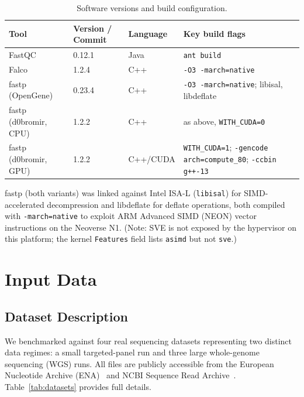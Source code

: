 \documentclass[a4paper,12pt]{article}
\begin{document}
\begin{table}[H]
  \centering
  \caption{Software versions and build configuration.}
  \label{tab:versions}
  \begin{tabular}{llll}
    \toprule
    \textbf{Tool} & \textbf{Version / Commit} & \textbf{Language} & \textbf{Key build flags} \\
    \midrule
    FastQC            & 0.12.1                  & Java     & \texttt{ant build} \\
    Falco             & 1.2.4                   & C++      & \texttt{-O3 -march=native} \\
    fastp (OpenGene)  & 0.23.4                  & C++      & \texttt{-O3 -march=native}; libisal, libdeflate \\
    fastp (d0bromir, CPU)  & 1.2.2              & C++      & as above, \texttt{WITH\_CUDA=0} \\
    fastp (d0bromir, GPU)  & 1.2.2              & C++/CUDA & \texttt{WITH\_CUDA=1}; \texttt{-gencode arch=compute\_80}; \texttt{-ccbin g++-13} \\
    \bottomrule
  \end{tabular}
\end{table}

\noindent
fastp (both variants) was linked against Intel ISA-L (\texttt{libisal}) for
SIMD-accelerated decompression and libdeflate for deflate operations, both
compiled with \texttt{-march=native} to exploit ARM Advanced SIMD (NEON)
vector instructions on the Neoverse N1.
(Note: SVE is not exposed by the hypervisor on this platform;
the kernel \texttt{Features} field lists \texttt{asimd} but not \texttt{sve}.)

\section{Input Data}
\label{sec:data}

\subsection{Dataset Description}

We benchmarked against four real sequencing datasets representing two distinct
data regimes: a small targeted-panel run and three large whole-genome
sequencing (WGS) runs.  All files are publicly accessible from the European
Nucleotide Archive (ENA)~\cite{Harrison2021ENA} and NCBI Sequence Read
Archive~\cite{Leinonen2011SRA}.  Table~\ref{tab:datasets} provides full
details.
\end{document}
